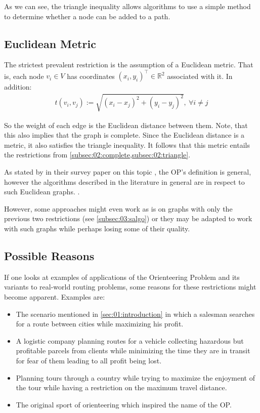 As we can see, the triangle inequality allows algorithms to use a simple method to determine whether a node can be added to a path.

\subsection{Euclidean Metric}
\label{subsec:02:euclidean}

The strictest prevalent restriction is the assumption of a Euclidean metric. 
That is, each node $v_i \in V$ has coordinates $(x_i, y_i)^\intercal \in \mathbb{R}^2$ associated with it.
In addition: 
\begin{align*}
  t(v_i,v_j) := \sqrt{(x_i - x_j)^2 + (y_i - y_j)^2},\ \forall i \neq j
\end{align*}

So the weight of each edge is the Euclidean distance between them. Note, that this also implies that the graph is complete.
Since the Euclidean distance is a metric, it also satisfies the triangle inequality.
It follows that this metric entails the restrictions from \cref{subsec:02:complete,subsec:02:triangle}.

As stated by \citeauthor{vansteenwegen_orienteering_2011} in their survey paper on this topic \cite{vansteenwegen_orienteering_2011}, the OP's definition is general, however the algorithms described in the literature in general are in respect to such Euclidean graphs. \cite{golden_orienteering_1987,tsiligiridis_heuristic_1984,szwarc_novel_2022,geem_harmony_2005}.

However, some approaches might even work as is on graphs with only the previous two restrictions (see \cref{subsec:03:salgo}) or they may be adapted to work with such graphs while perhaps losing some of their quality. %

\subsection{Possible Reasons}
\label{subsec:02:reasons}

If one looks at examples of applications of the Orienteering Problem and its variants to real-world routing problems,
some reasons for these restrictions might become apparent. Examples are:
\begin{itemize}
  \item The scenario mentioned in \cref{sec:01:introduction} in which a salesman searches for a route between cities while maximizing his profit. \cite{chao_fast_1996}
  \item A logistic company planning routes for a vehicle collecting hazardous but profitable parcels from clients while minimizing the time they are in transit for fear of them leading to all profit being lost. \cite{santini_hazardous_2022}    
  \item Planning tours through a country while trying to maximize the enjoyment of the tour while having a restriction on the maximum travel distance. \cite{geem_harmony_2005}
  \item The original sport of orienteering which inspired the name of the OP. \cite{tsiligiridis_heuristic_1984}  
\end{itemize}

